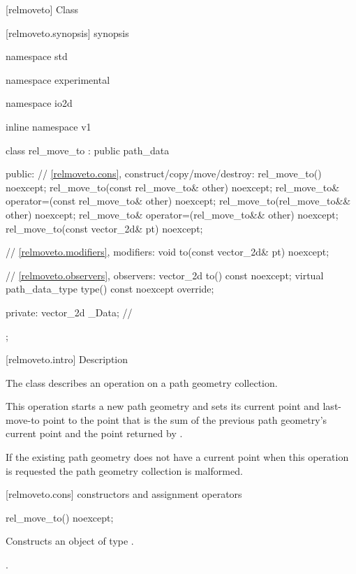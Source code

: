  [relmoveto] {Class }

 [relmoveto.synopsis] { synopsis}

\begin{codeblock}
namespace std { namespace experimental { namespace io2d { inline namespace v1 {
  class rel_move_to : public path_data {
  public:
    // \ref{relmoveto.cons}, construct/copy/move/destroy:
    rel_move_to() noexcept;
    rel_move_to(const rel_move_to& other) noexcept;
    rel_move_to& operator=(const rel_move_to& other) noexcept;
    rel_move_to(rel_move_to&& other) noexcept;
    rel_move_to& operator=(rel_move_to&& other) noexcept;
    rel_move_to(const vector_2d& pt) noexcept;

    // \ref{relmoveto.modifiers}, modifiers:
    void to(const vector_2d& pt) noexcept;

    // \ref{relmoveto.observers}, observers:
    vector_2d to() const noexcept;
    virtual path_data_type type() const noexcept override;
    
  private:
    vector_2d _Data; // \expos
  };
} } } }
\end{codeblock}

 [relmoveto.intro] { Description}

\pnum
{}
The class  describes an operation on a path geometry collection.

\pnum
This operation starts a new path geometry and sets its current point and last-move-to point to the point that is the sum of the previous path geometry's current point and the point returned by .

\pnum
If the existing path geometry does not have a current point when this operation is requested the path geometry collection is malformed.

 [relmoveto.cons] { constructors and assignment operators}

\begin{itemdecl}
    rel_move_to() noexcept;
\end{itemdecl}
\begin{itemdescr}
	\pnum
	\effects
	Constructs an object of type .
	
	\pnum
	\postconditions
	.
\end{itemdescr}

